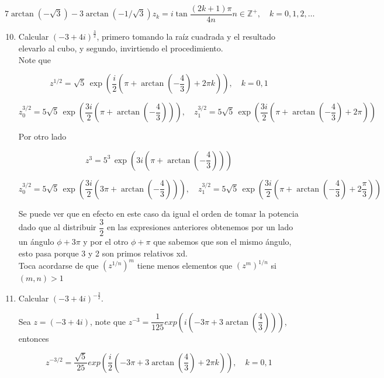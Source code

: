 \documentclass[11pt]{article}
\begin{document}
$$7\arctan(-\sqrt{3})-3\arctan(-1/\sqrt{3})
z_{k}=i \tan \frac{(2 k+1) \pi}{4 n} n \in \mathbb{Z}^{+}, \quad k=0,1,2, \ldots
$$

\begin{enumerate}
  \setcounter{enumi}{9}
  \item Calcular $(-3+4 i)^{\frac{3}{2}}$, primero tomando la raíz cuadrada y el resultado elevarlo al cubo, y segundo, invirtiendo el procedimiento.\\

  Note que

$$z^{1/2} = \sqrt{5} \, \exp \left( \frac{i}{2} \left( \pi + \arctan \left( -\frac{4}{3} \right) + 2 \pi k \right) \right), \quad k = 0, 1$$

$$z_0^{3/2}= 5 \sqrt{5} \, \exp \left( \frac{3i}{2} \left( \pi + \arctan \left( -\frac{4}{3} \right) \right) \right), \quad z_1^{3/2} = 5 \sqrt{5} \, \exp \left( \frac{3i}{2} \left( \pi + \arctan \left( -\frac{4}{3} \right) + 2 \pi \right) \right)$$

Por otro lado

$$z^3 = 5^3 \, \exp \left( 3i \left( \pi + \arctan \left( -\frac{4}{3} \right) \right) \right)$$

$$z_0^{3/2}= 5 \sqrt{5} \, \exp \left( \frac{3i}{2} \left( 3 \pi + \arctan \left( -\frac{4}{3} \right) \right) \right),\quad z_1^{3/2} = 5 \sqrt{5} \, \exp \left( \frac{3i}{2} \left( \pi + \arctan \left( -\frac{4}{3} \right) + 2 \frac{\pi}{3} \right) \right)
$$

Se puede ver que en efecto en este caso da igual el orden de tomar la potencia dado que al distribuir $\dfrac{3}{2}$ en las expresiones anteriores obtenemos por un lado un ángulo $\phi+3\pi$ y por el otro $\phi+\pi$ que sabemos que son el mismo ángulo, esto pasa  porque 3 y 2 son primos relativos xd.\\

Toca acordarse de que $\left(z^{1/n}\right)^m$ tiene menos elementos que $\left(z^{m}\right)^{1/n}$ si $(m,n)> 1$

  \item Calcular $(-3+4 i)^{-\frac{3}{2}}$.

  Sea $z=(-3+4i)$, note que $z^{-3}=\dfrac{1}{125} exp\left( i \left(-3\pi +3\arctan\left(\dfrac{4}{3}\right)\right)\right)$, entonces


$$z^{-3/2}=\dfrac{\sqrt{5} }{25} exp\left( \frac{i}{2} \left(-3\pi +3\arctan\left(\dfrac{4}{3}\right)+2\pi k\right)\right), \quad k=0,1$$
\end{enumerate}
\end{document}
